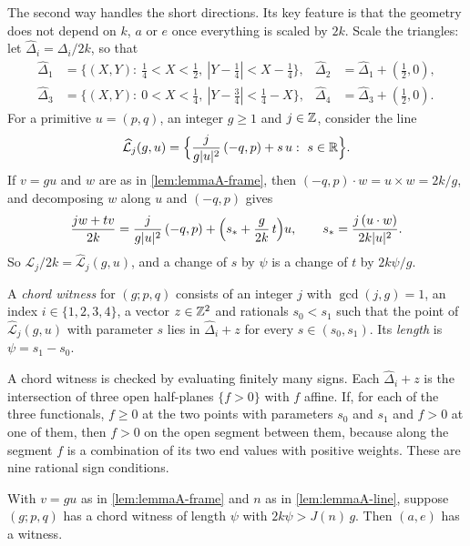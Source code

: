 The second way handles the short directions. Its key feature is that the
geometry does not depend on $k$, $a$ or $e$ once everything is scaled by
$2k$. Scale the triangles: let $\widehat\Delta_i=\Delta_i/2k$, so that
\begin{align*}
\widehat\Delta_1&=\{(X,Y):\ \tfrac14<X<\tfrac12,\ |Y-\tfrac14|<X-\tfrac14\}, &
\widehat\Delta_2&=\widehat\Delta_1+(\tfrac12,0),\\
\widehat\Delta_3&=\{(X,Y):\ 0<X<\tfrac14,\ |Y-\tfrac34|<\tfrac14-X\}, &
\widehat\Delta_4&=\widehat\Delta_3+(\tfrac12,0).
\end{align*}
For a primitive $u=(p,q)$, an integer $g\ge1$ and $j\in\mathbb{Z}$, consider the
line
\[
\widehat{\mathcal L}_j(g,u)=\Bigl\{\frac{j}{g|u|^2}\,(-q,p)+s\,u:\ s\in\mathbb{R}\Bigr\}.
\]
If $v=gu$ and $w$ are as in \autoref{lem:lemmaA-frame}, then
$(-q,p)\cdot w=u\times w=2k/g$, and decomposing $w$ along $u$ and $(-q,p)$
gives
\begin{equation}
\frac{jw+tv}{2k}=\frac{j}{g|u|^2}\,(-q,p)+\Bigl(s_*+\frac{g}{2k}\,t\Bigr)u,
\qquad s_*=\frac{j\,(u\cdot w)}{2k|u|^2}.
\label{eq:lemmaA-scaled}
\end{equation}
So $\mathcal L_j/2k=\widehat{\mathcal L}_j(g,u)$, and a change of $s$ by $\psi$ is a change of $t$ by
$2k\psi/g$.

\begin{definition}
\label{def:lemmaA-witness}
A \emph{chord witness} for $(g;p,q)$ consists of an integer $j$ with
$\gcd(j,g)=1$, an index $i\in\{1,2,3,4\}$, a vector $z\in\mathbb{Z}^2$ and rationals
$s_0<s_1$ such that the point of $\widehat{\mathcal L}_j(g,u)$ with parameter $s$ lies in
$\widehat\Delta_i+z$ for every $s\in(s_0,s_1)$. Its \emph{length} is
$\psi=s_1-s_0$.
\end{definition}

A chord witness is checked by evaluating finitely many signs. Each
$\widehat\Delta_i+z$ is the intersection of three open half-planes $\{f>0\}$ with
$f$ affine. If, for each of the three functionals, $f\ge0$ at the two points
with parameters $s_0$ and $s_1$ and $f>0$ at one of them, then $f>0$ on the
open segment between them, because along the segment $f$ is a combination
of its two end values with positive weights. These are nine rational sign
conditions.

\begin{proposition}
\label{prop:lemmaA-table}
With $v=gu$ as in \autoref{lem:lemmaA-frame} and $n$ as in
\autoref{lem:lemmaA-line}, suppose $(g;p,q)$ has a chord witness of length
$\psi$ with $2k\psi>J(n)\,g$. Then $(a,e)$ has a witness.
\end{proposition}

